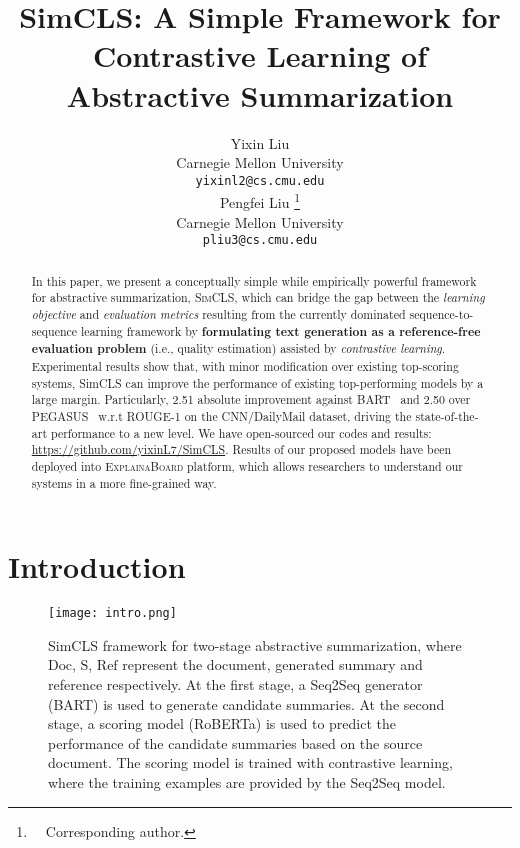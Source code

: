 \documentclass[11pt,a4paper]{article}
\title{{SimCLS}: A Simple Framework for \\Contrastive Learning of Abstractive Summarization}
\author{Yixin Liu \\
  Carnegie Mellon University \\
  \texttt{yixinl2@cs.cmu.edu} \\\And
  Pengfei Liu \thanks{\ \  Corresponding author.}\\
  Carnegie Mellon University \\
  \texttt{pliu3@cs.cmu.edu} \\}
\date{}
\begin{document}
\maketitle
\begin{abstract}

In this paper, we present a conceptually simple while empirically powerful framework for abstractive summarization,  \textsc{SimCLS}, which can bridge the gap between the \textit{learning objective} and \textit{evaluation metrics} resulting from the currently dominated sequence-to-sequence learning framework by \textbf{formulating text generation as a reference-free evaluation problem} (i.e., quality estimation) assisted by \textit{contrastive learning}.
Experimental results show that, with minor modification over existing top-scoring systems, SimCLS can improve the performance of existing top-performing models by a large margin.
Particularly,  2.51 absolute improvement against BART~\citep{lewis-etal-2020-bart} and 2.50 over PEGASUS~\citep{zhang2020pegasus} w.r.t ROUGE-1 on the CNN/DailyMail dataset, driving the state-of-the-art performance to a new level.
We have open-sourced our codes and results: \url{https://github.com/yixinL7/SimCLS}.
Results of our proposed models have been deployed into \textsc{ExplainaBoard} \cite{liu2021explainaboard} platform, which allows researchers to understand our systems in a more fine-grained way.
\end{abstract}

\section{Introduction}

\begin{figure}[t!]
    \centering
    \texttt{[image: intro.png]}
    \caption{SimCLS framework for two-stage abstractive summarization, where $\text{Doc}$, $\text{S}$, $\text{Ref}$ represent the document, generated summary and reference respectively.  At the first stage, a Seq2Seq generator (BART) is used to generate candidate summaries. At the second stage, a scoring model (RoBERTa) is used to predict the performance of the candidate summaries based on the source document. The scoring model is trained with contrastive learning, where the training examples are provided by the Seq2Seq model.}
    \label{fig:intro}
\end{figure}
\end{document}
